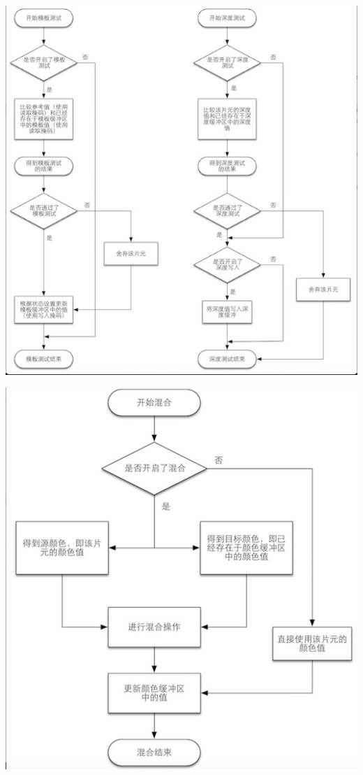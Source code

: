 \documentclass[9pt, b5paper]{article}
\begin{document}
\begin{enumerate}
\begin{itemize}
\includegraphics[width=.9\linewidth]{./pic/fragment.png}

\includegraphics[width=.9\linewidth]{./pic/fragment2.png}
\end{itemize}
\end{enumerate}
\end{document}
